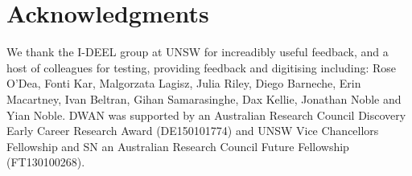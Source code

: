 \documentclass[article]{jss}
\begin{document}
\section*{Acknowledgments}
We thank the I-DEEL group at UNSW for increadibly useful feedback, and a host of colleagues for testing, providing feedback and digitising including: Rose O'Dea, Fonti Kar, Malgorzata Lagisz, Julia Riley, Diego Barneche, Erin Macartney, Ivan Beltran, Gihan Samarasinghe, Dax Kellie, Jonathan Noble and Yian Noble. DWAN was supported by an Australian Research Council Discovery Early Career Research Award (DE150101774) and UNSW Vice Chancellors Fellowship and SN an Australian Research Council Future Fellowship (FT130100268). 



\end{document}
